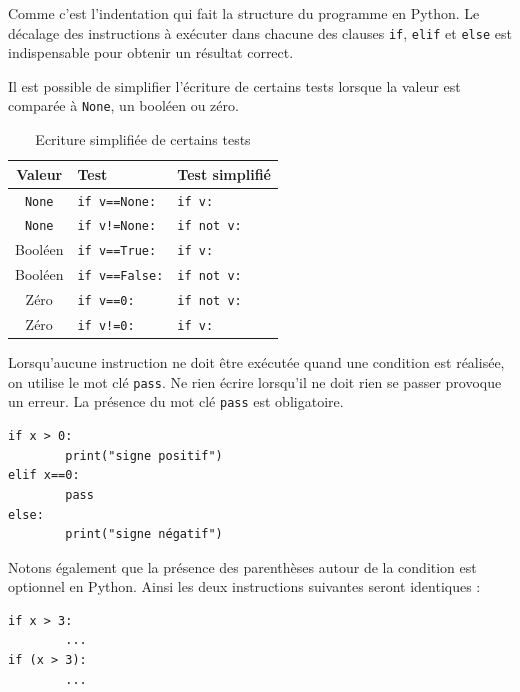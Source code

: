 \documentclass[12pt, a4paper]{article}
\begin{document}
Comme c'est l'indentation qui fait la structure du programme en Python. Le décalage des instructions à exécuter dans chacune des clauses \lstinline{if}, \lstinline{elif} et \lstinline{else} est indispensable pour obtenir un résultat correct.

Il est possible de simplifier l'écriture de certains tests lorsque la valeur est comparée à \lstinline{None}, un booléen ou zéro.
\begin{table}[H]
	\begin{center}
		\begin{tabular}{|c|l|l|}
			\hline
			\textbf{Valeur} & \textbf{Test} & \textbf{Test simplifié} \\
			\hline
			\lstinline{None} & \lstinline{if v==None:} & \lstinline{if v:} \\
			\lstinline{None} & \lstinline{if v!=None:} & \lstinline{if not v:} \\
			\hline
			Booléen & \lstinline{if v==True:} & \lstinline{if v:} \\
			Booléen & \lstinline{if v==False:} & \lstinline{if not v:} \\
			\hline
			Zéro & \lstinline{if v==0:} & \lstinline{if not v:} \\
			Zéro & \lstinline{if v!=0:} & \lstinline{if v:} \\
			\hline
		\end{tabular}
		\caption{Ecriture simplifiée de certains tests}
		\label{tab:simplification_tests}
	\end{center}
\end{table}

Lorsqu'aucune instruction ne doit être exécutée quand une condition est réalisée, on utilise le mot clé \lstinline{pass}. Ne rien écrire lorsqu'il ne doit rien se passer provoque un erreur. La présence du mot clé \lstinline{pass} est obligatoire.
\begin{lstlisting}
if x > 0:
		print("signe positif")
elif x==0:
		pass
else:
		print("signe négatif")
\end{lstlisting}

Notons également que la présence des parenthèses autour de la condition est optionnel en Python. Ainsi les deux instructions suivantes seront identiques :
\begin{lstlisting}
if x > 3:
		...
if (x > 3):
		...
\end{lstlisting}


\end{document}
